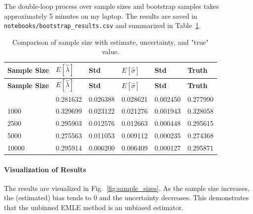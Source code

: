 \documentclass{article}
\begin{document}
The double-loop process over sample sizes and bootstrap samples takes approximately 5 minutes on my laptop. The results are saved in \texttt{notebooks/bootstrap\_results.csv} and summarized in Table~\ref{tab:sample_comparison}.


\begin{longtable}{llllll}
\caption{Comparison of sample size with estimate, uncertainty, and "true" value.}\label{tab:sample_comparison}\\
\toprule
\textbf{Sample Size} & \textbf{$E[\hat{\lambda}]$} & \textbf{Std} & \textbf{$E[\hat{\sigma}]$} & \textbf{Std} & \textbf{Truth} \\
\midrule
\endfirsthead
\toprule
\textbf{Sample Size} & \textbf{$E[\hat{\lambda}]$} & \textbf{Std} & \textbf{$E[\hat{\sigma}]$} & \textbf{Std} & \textbf{Truth} \\
\midrule
\endhead
\bottomrule
\endfoot
500 & 0.281632 & 0.026388 & 0.028621 & 0.002450 & 0.277990 \\
1000 & 0.329699 & 0.023122 & 0.021276 & 0.001943 & 0.328058 \\
2500 & 0.295903 & 0.012576 & 0.012663 & 0.000448 & 0.295615 \\
5000 & 0.275563 & 0.011053 & 0.009112 & 0.000235 & 0.274368 \\
10000 & 0.295914 & 0.006200 & 0.006409 & 0.000127 & 0.295871 \\
\end{longtable}

\paragraph{Visualization of Results}
The results are visualized in Fig.~\ref{fig:sample_sizes}. As the sample size increases, the (estimated) bias tends to 0 and the uncertainty decreases. This demonstrates that the unbinned EMLE method is an unbiased estimator. 
\end{document}
